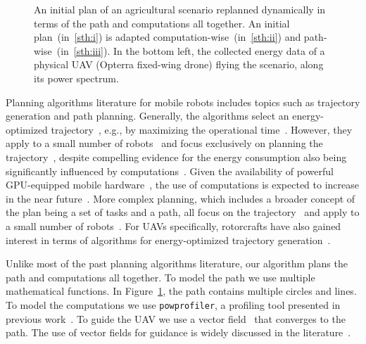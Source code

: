 \documentclass[letterpaper,10pt,conference]{ieeeconf}
\newcommand{\stt}[1]{{\small\tt #1}} %
\newcommand{\powprof}{\stt{powprofiler}}
\newcommand{\figpath}{./figures}
\theoremstyle{definition}
\begin{document}
\begin{figure}[t]
  \centering
  \caption{An initial plan of an agricultural scenario replanned dynamically in terms of the path and computations all together. An initial plan~(in~\ref{sth:i}) is adapted computation-wise~(in~\ref{sth:ii}) and path-wise~(in~\ref{sth:iii}). In the bottom left, the collected energy data of a physical UAV (Opterra fixed-wing drone) flying the scenario, along its power spectrum.}
  \label{fig:il-abs}
\end{figure}

\vspace*{-2ex}
Planning algorithms literature for mobile robots includes topics such as trajectory generation and path planning. Generally, the algorithms select an energy-optimized trajectory~\cite{mei2004energy}, e.g., by maximizing the operational time~\cite{wahab2015energy}. However, they apply to a small number of robots~\cite{kim2005energy} and focus exclusively on planning the trajectory~\cite{kim2008minimum}, despite compelling evidence for the energy consumption also being significantly influenced by computations~\cite{mei2005case}. Given the availability of powerful GPU-equipped mobile hardware~\cite{rizvi2017general}, the use of computations is expected to increase in the near future~\cite{abramov2012real,satria2016real,jaramillo2019visual}. More complex planning, which includes a broader concept of the plan being a set of tasks and a path, all focus on the trajectory~\cite{mei2005case,mei2006deployment} and apply to a small number of robots~\cite{sadrpour2013mission,sadrpour2013experimental}. For UAVs specifically, rotorcrafts have also gained interest in terms of algorithms for energy-optimized trajectory generation~\cite{morbidi2016minimum,kreciglowa2017energy}. 

Unlike most of the past planning algorithms literature, our algorithm plans the path and computations all together. To model the path we use multiple mathematical functions. In Figure~\ref{fig:il-abs}, the path contains multiple circles and lines. To model the computations we use \powprof{}, a profiling tool presented in previous work~\cite{seewald2019coarse}. To guide the UAV we use a vector field~\cite{de2017guidance} that converges to the path. The use of vector fields for guidance is widely discussed in the literature~\cite{lindemann2005smoothly,gonccalves2010vector,panagou2014motion,zhou2014vector,kapitanyuk2017guiding,de2017guidance}. 
\end{document}
